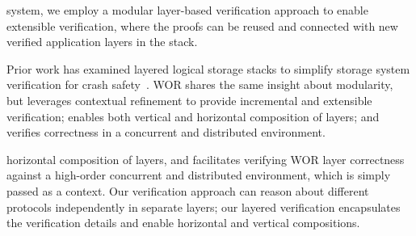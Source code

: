 
system, we employ a modular layer-based verification approach to enable extensible verification, where the 
proofs can be reused and connected with new verified application layers in the stack. 


Prior work has examined layered logical storage stacks to simplify storage system 
verification for crash safety~\cite{fscq, pushbuttonfs,vijay}.
WOR shares the same insight about modularity, 
but leverages contextual refinement to provide incremental and extensible verification; 
enables both vertical and horizontal composition of layers; and verifies correctness 
in a concurrent and distributed environment. 

horizontal composition of layers, and facilitates verifying WOR layer correctness against a 
high-order concurrent and distributed environment, which is simply passed as a context.
Our verification approach can reason about different protocols independently in separate layers;
our layered verification encapsulates the verification details and enable horizontal and vertical compositions. 

